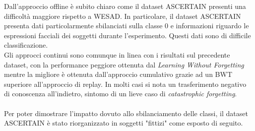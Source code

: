 Dall'approccio offline è subito chiaro come il dataset ASCERTAIN presenti una difficoltà maggiore rispetto a WESAD. In particolare, il dataset ASCERTAIN presenta dati particolarmente sbilanciati sulla classe 0 e informazioni riguardo le espressioni facciali dei soggetti durante l'esperimento. Questi dati sono di difficile classificazione.\\
Gli approcci continui sono comunque in linea con i risultati sul precedente dataset, con la performance peggiore ottenuta dal \textit{Learning Without Forgetting} mentre la migliore è ottenuta dall'approccio cumulativo grazie ad un BWT superiore all'approccio di replay. In molti casi si nota un trasferimento negativo di conoscenza all'indietro, sintomo di un lieve caso di \textit{catastrophic forgetting}.\\\\
Per poter dimostrare l'impatto dovuto allo sbilanciamento delle classi, il dataset ASCERTAIN è stato riorganizzato in soggetti "fittizi" come esposto di seguito.


\pagebreak
